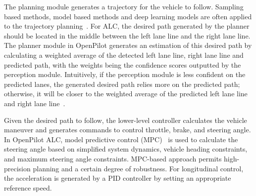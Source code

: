 The planning module generates a trajectory for the vehicle to follow. Sampling based methods, model based methods and deep learning models are often applied to the trajectory planning~\cite{qian2016motion}. For ALC, the desired path generated by the planner should be located in the middle between the left lane line and the right lane line. %
The planner module in OpenPilot generates an estimation of this desired path by calculating a weighted average of the detected left lane line, right lane line and predicted path, with the weights being the confidence scores outputted by the perception module. Intuitively, if the perception module is less confident on the predicted lanes, the generated desired path relies more on the predicted path; otherwise, it will be closer to the weighted average of the predicted left lane line and right lane line~\cite{liang2021endtoend,openpilot}. 

Given the desired path to follow, the lower-level controller calculates the vehicle maneuver and generates commands to control throttle, brake, and steering angle. In OpenPilot ALC, model predictive control (MPC)~\cite{bujarbaruah2018adaptive} is used to calculate the steering angle based on simplified system dynamics, vehicle heading constraints, and maximum steering angle constraints.
MPC-based approach permits high-precision planning and a certain degree of robustness. For longitudinal control, the acceleration is generated by a PID controller by setting an appropriate reference speed.

